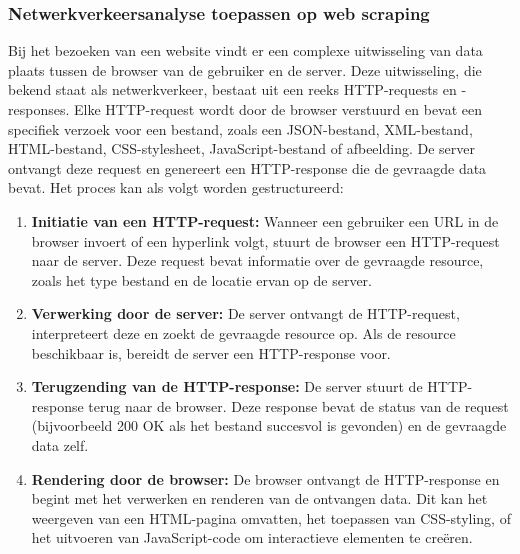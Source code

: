 \subsubsection{Netwerkverkeersanalyse toepassen op web scraping}
Bij het bezoeken van een website vindt er een complexe uitwisseling van data plaats tussen de browser van de gebruiker en de server. Deze uitwisseling, die bekend staat als netwerkverkeer, bestaat uit een reeks HTTP-requests en -responses.
Elke HTTP-request wordt door de browser verstuurd en bevat een specifiek verzoek voor een bestand, zoals een JSON-bestand, XML-bestand, HTML-bestand, CSS-stylesheet, JavaScript-bestand of afbeelding. De server ontvangt deze request en genereert een HTTP-response die de gevraagde data bevat. Het proces kan als volgt worden gestructureerd:
\begin{enumerate}
    \item \textbf{Initiatie van een HTTP-request:} Wanneer een gebruiker een URL in de browser invoert of een hyperlink volgt, stuurt de browser een HTTP-request naar de server. Deze request bevat informatie over de gevraagde resource, zoals het type bestand en de locatie ervan op de server.

    \item \textbf{Verwerking door de server:} De server ontvangt de HTTP-request, interpreteert deze en zoekt de gevraagde resource op. Als de resource beschikbaar is, bereidt de server een HTTP-response voor.

    \item \textbf{Terugzending van de HTTP-response:} De server stuurt de HTTP-response terug naar de browser. Deze response bevat de status van de request (bijvoorbeeld 200 OK als het bestand succesvol is gevonden) en de gevraagde data zelf.

    \item \textbf{Rendering door de browser:} De browser ontvangt de HTTP-response en begint met het verwerken en renderen van de ontvangen data. Dit kan het weergeven van een HTML-pagina omvatten, het toepassen van CSS-styling, of het uitvoeren van JavaScript-code om interactieve elementen te creëren.
\end{enumerate}

